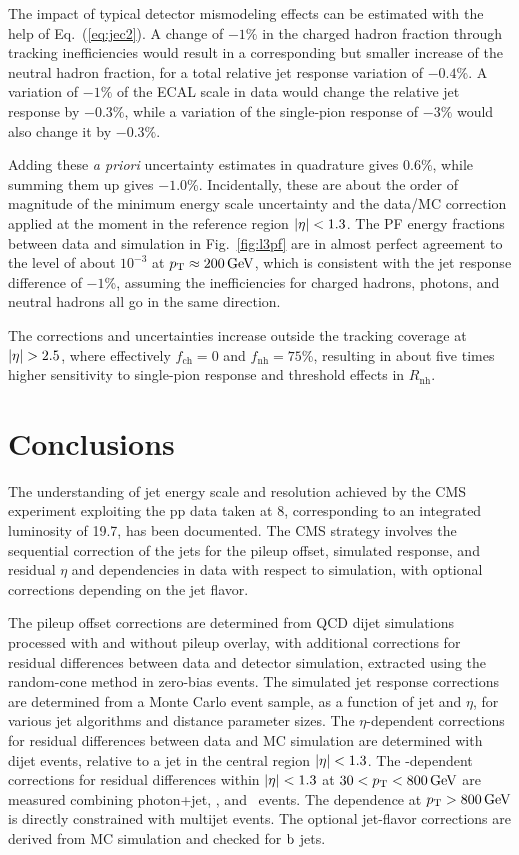 \documentclass[11pt,twoside,a4paper,cmspaper,final,collab]{cms-tdr}
\begin{document}
The impact of typical detector mismodeling effects can be estimated with the help of Eq.~(\ref{eq:jec2}). A change of $-1\%$ in the charged hadron fraction through tracking inefficiencies would result in a corresponding but smaller increase of the neutral hadron fraction, for a total relative jet response variation of $-0.4\%$. A variation of $-1\%$ of the ECAL scale in data would change the relative jet response by $-0.3\%$, while a variation of the single-pion response of $-3\%$ would also change it by $-0.3\%$.

Adding these \textit{a priori} uncertainty estimates in quadrature gives $0.6$\%, while summing them up gives $-1.0$\%. Incidentally, these are about the order of magnitude of the minimum energy scale uncertainty and the data/MC correction applied at the moment in the reference region $\lvert \eta \rvert<1.3$. The PF energy fractions between data and simulation in Fig.~\ref{fig:l3pf} are in almost perfect agreement to the level of about $10^{-3}$ at $p_{\mathrm{T}}\approx 200\,\text{Ge\hspace{-.08em}V}$, which is consistent with the jet response difference of $-1$\%, assuming the inefficiencies for charged hadrons, photons, and neutral hadrons all go in the same direction.

The corrections and uncertainties increase outside the tracking coverage at $\lvert \eta \rvert>2.5$, where effectively $f_\text{ch}=0$ and $f_\mathrm{nh}=75$\%, resulting in about five times higher sensitivity to single-pion response and threshold effects in $R_\mathrm{nh}$.


\section{Conclusions}
\label{sec:conclusions}

The understanding of jet energy scale and resolution achieved by the CMS experiment exploiting the pp data taken at 8\TeV, corresponding to an integrated luminosity of 19.7\fbinv, has been documented.
The CMS strategy involves the sequential correction of the jets for the pileup offset,
simulated response, and residual $\eta$ and \pt dependencies in data with respect to simulation, with optional corrections depending on the jet flavor.

The pileup offset corrections are determined from QCD dijet simulations processed with and without pileup overlay, with additional
corrections for residual differences between data and detector simulation, extracted using the random-cone method in zero-bias events.
The simulated jet response corrections are determined from a Monte Carlo event sample, as a function of jet \pt and $\eta$, for various jet algorithms
and distance parameter sizes.
The $\eta$-dependent corrections for residual differences between data and MC simulation are determined with dijet events, relative
to a jet in the central region $\lvert \eta \rvert<1.3$.
The \pt-dependent corrections for residual differences within $\lvert \eta \rvert<1.3$ at $30<p_{\mathrm{T}}<800\,\text{Ge\hspace{-.08em}V}$
are measured combining photon+jet, \zmmjet, and \zeejet\ events. The \pt dependence at $p_{\mathrm{T}}>800\,\text{Ge\hspace{-.08em}V}$ is directly
constrained with multijet events.  The optional jet-flavor corrections are derived from MC simulation and checked for $\mathrm{b}$ jets.
\end{document}
